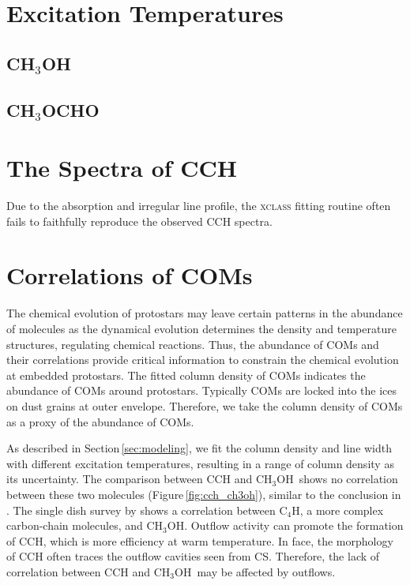 \documentclass[twocolumn]{aastex62}
\newcommand{\methylformate}{\mbox{CH$_{3}$OCHO}}
\newcommand{\methanol}{\mbox{CH$_{3}$OH}}
\begin{document}
\section{Excitation Temperatures}
\subsection{\methanol}
\subsection{\methylformate}

\section{The Spectra of CCH}
Due to the absorption and irregular line profile, the \textsc{xclass} fitting routine often fails to faithfully reproduce the observed CCH spectra.

\section{Correlations of COMs}
The chemical evolution of protostars may leave certain patterns in the abundance of molecules as the dynamical evolution determines the density and temperature structures, regulating chemical reactions.  Thus, the abundance of COMs and their correlations provide critical information to constrain the chemical evolution at embedded protostars.  The fitted column density of COMs indicates the abundance of COMs around protostars.  Typically COMs are locked into the ices on dust grains at outer envelope. Therefore, we take the column density of COMs as a proxy of the abundance of COMs.  

As described in Section\,\ref{sec:modeling}, we fit the column density and line width with different excitation temperatures, resulting in a range of column density as its uncertainty.  The comparison between CCH and \methanol\ shows no correlation between these two molecules (Figure\,\ref{fig:cch_ch3oh}), similar to the conclusion in \citet{2018ApJS..236...52H}.  The single dish survey by \citet{2016ApJ...833..125G} shows a correlation between C$_{4}$H, a more complex carbon-chain molecules, and \methanol.  Outflow activity can promote the formation of CCH, which is more efficiency at warm temperature.  In face, the morphology of CCH often traces the outflow cavities seen from CS.  Therefore, the lack of correlation between CCH and \methanol\ may be affected by outflows.
\end{document}
